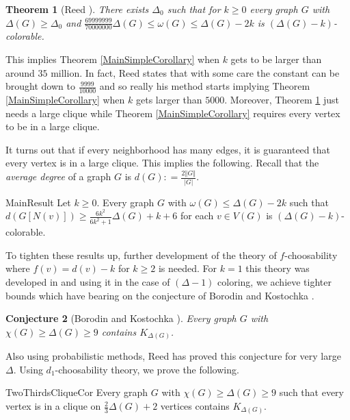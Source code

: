 \documentclass[12pt]{article}
\theoremstyle{plain}
\newtheorem{thm}{Theorem}[section]
\newtheorem{conjecture}[thm]{Conjecture}
\theoremstyle{definition}
\theoremstyle{remark}
\newcommand{\card}[1]{\left|#1\right|}
\newcommand{\size}[1]{\left\Vert#1\right\Vert}
\newcommand{\DefinedAs}{\mathrel{\mathop:}=}
\begin{document}
\begin{thm}[Reed \cite{reed1998omega}]\label{ReedOmega}
There exists $\Delta_0$ such that for $k \geq 0$ every graph $G$ with $\Delta(G) \geq \Delta_0$ and 
$\frac{69999999}{70000000}\Delta(G) \leq \omega(G) \leq \Delta(G) - 2k$ is $(\Delta(G)-k)$-colorable.
\end{thm}

This implies Theorem \ref{MainSimpleCorollary} when $k$ gets to be larger than around $35$ million.  In fact, Reed states that with some care the constant can be brought down to $\frac{9999}{10000}$ and so really his method starts implying Theorem \ref{MainSimpleCorollary} when $k$ gets larger than $5000$.  Moreover, Theorem \ref{ReedOmega} just needs a large clique while Theorem \ref{MainSimpleCorollary} requires every vertex to be in a large clique.
 
It turns out that if every neighborhood has many edges, it is guaranteed that every vertex is in a large clique.  This implies the following.  Recall that the \emph{average degree} of a graph $G$ is $d(G) \DefinedAs \frac{2\size{G}}{\card{G}}$.

\begin{repthm}{MainResult}
Let $k \geq 0$. Every graph $G$ with $\omega(G) \leq \Delta(G) - 2k$ such that $d(G[N(v)]) \geq \frac{6k^2}{6k^2 + 1}\Delta(G) + k + 6$ for each $v \in V(G)$ is $(\Delta(G)-k)$-colorable.
\end{repthm}

To tighten these results up, further development of the theory of $f$-choosability where $f(v) = d(v) - k$ for $k \geq 2$ is needed.  For $k=1$ this theory was developed in \cite{mules} and using it in the case of $(\Delta-1)$ coloring, we achieve tighter bounds which have bearing on the conjecture of Borodin and Kostochka \cite{borodin1977upper}.

\begin{conjecture}[Borodin and Kostochka \cite{borodin1977upper}]\label{BK}
Every graph $G$ with $\chi(G) \geq \Delta(G) \geq 9$ contains $K_{\Delta(G)}$.
\end{conjecture}

Also using probabilistic methods, Reed \cite{reed1999strengthening} has proved this conjecture for very large $\Delta$.  Using $d_1$-choosability theory, we prove the following.

\begin{repthm}{TwoThirdsCliqueCor}
Every graph $G$ with $\chi(G) \geq \Delta(G) \geq 9$ such that every
vertex is in a clique on $\frac23\Delta(G) + 2$ vertices contains $K_{\Delta(G)}$.
\end{repthm}
\end{document}
